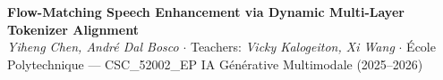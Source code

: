 \documentclass[a3paper,landscape,10pt]{article}
\begin{document}

\begin{center}
\colorbox{polytblue}{%
\parbox{0.97\textwidth}{%
\centering\vspace{5pt}
{\fontsize{24}{29}\selectfont\bfseries\color{white}
Flow-Matching Speech Enhancement via Dynamic Multi-Layer Tokenizer Alignment}\\[4pt]
{\fontsize{12}{15}\selectfont\color{white!90}
\textit{Yiheng Chen, Andr\'e Dal Bosco} \quad $\cdot$ \quad
Teachers: \textit{Vicky Kalogeiton, Xi Wang} \quad $\cdot$ \quad
{\'E}cole Polytechnique --- CSC\_52002\_EP IA G\'en\'erative Multimodale (2025--2026)}\\[4pt]
}}
\end{center}
\vspace{-4pt}
\end{document}
